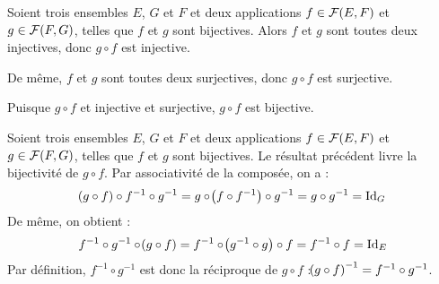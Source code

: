 \documentclass[a4paper,french,bookmarks]{book}
\begin{document}
\begin{enumerate}
        \noafter
        \nobefore
        \begin{nproof}
            Soient trois ensembles $E$, $G$ et $F$ et deux applications $f \in \mathcal{F}\!\left(E, F\right)$ et $g \in \mathcal{F}\!\left(F, G\right)$, telles que $f$ et $g$ sont bijectives. Alors $f$ et $g$ sont toutes deux injectives, donc $g \circ f$ est injective.
            
            De même, $f$ et $g$ sont toutes deux surjectives, donc $g \circ f$ est surjective.
            
            Puisque $g \circ f$ et injective et surjective, $g \circ f$ est bijective.
        \end{nproof}
        \begin{nproof}
            Soient trois ensembles $E$, $G$ et $F$ et deux applications $f \in \mathcal{F}\!\left(E, F\right)$ et $g \in \mathcal{F}\!\left(F, G\right)$, telles que $f$ et $g$ sont bijectives. Le résultat précédent livre la bijectivité de $g \circ f$. Par associativité de la composée, on a :
            \[ 
                \!\left(g \circ f\right) \circ f^{-1} \circ g^{-1} = g \circ \!\left(f \circ f^{-1}\right) \circ g^{-1} = g \circ g^{-1} = \operatorname{Id}_G
            \]
            De même, on obtient :
            \[
                f^{-1} \circ g^{-1} \circ \!\left(g \circ f\right) = f^{-1} \circ \!\left(g^{-1} \circ g\right) \circ f = f^{-1} \circ f = \operatorname{Id}_E
            \]
            Par définition, $f^{-1} \circ g^{-1}$ est donc la réciproque de $g \circ f$ :\quad $\!\left(g \circ f\right)^{-1} = f^{-1} \circ g^{-1}$.
        \end{nproof}
        

\end{enumerate}
\end{document}
